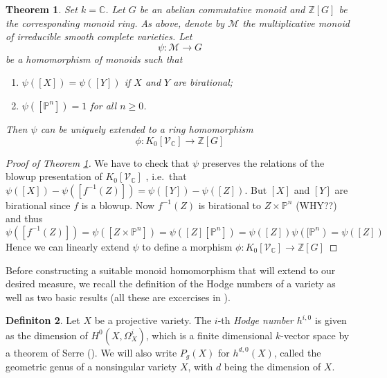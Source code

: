 \documentclass[11pt, a4paper, german]{article}
\theoremstyle{plain}
\newtheorem{theorem}{Theorem}
\theoremstyle{definition}
\newtheorem{definition}[theorem]{Definiton}
\newcommand{\gring}[1][k]{K_0[\mathcal{V}_#1]}
\begin{document}
\begin{theorem}
    \label{th1}
    Set $k = \mathbb{C}$. Let $G$ be an abelian commutative monoid and $\mathbb{Z}[G]$ be the corresponding monoid ring. As above, denote
    by $\mathcal{M}$ the multiplicative monoid of irreducible smooth complete varieties. Let
    \[
        \psi: \mathcal{M} \to G
    \]
    be a homomorphism of monoids such that
    \begin{enumerate}
        \item $\psi([X]) = \psi([Y])$ if $X$ and $Y$ are birational;
        \item $\psi([\mathbb{P}^n]) = 1$ for all $n \ge 0$.
    \end{enumerate}
    Then $\psi$ can be uniquely extended to a ring homomorphism 
    \[
        \phi: \gring[\mathbb{C}] \to \mathbb{Z} [G]
    \]
\end{theorem}

\begin{proof}[Proof of Theorem \ref{th1}]
    We have to check that $\psi$ preserves the relations of the blowup presentation of $\gring[\mathbb{C}]$
    , i.e.\ that $\psi([X]) - \psi([f^{-1}(Z)]) = \psi([Y]) - \psi([Z])$. 
    But $[X]$ and $[Y]$ are birational since $f$ is a blowup.
    Now $f^{-1}(Z)$ is birational to $Z \times \mathbb{P}^n$ (WHY??) and thus 
    \[
        \psi([f^{-1}(Z)]) = \psi([Z \times \mathbb{P}^n]) = \psi([Z][\mathbb{P}^n]) = \psi([Z])\psi([\mathbb{P}^n) = \psi([Z])
    \]
    Hence we can linearly extend $\psi$ to define a morphism $\phi \colon \gring[\mathbb{C}] \to \mathbb{Z} [G]$
\end{proof}

Before constructing a suitable monoid homomorphism that will extend to our desired measure, we recall the definition of the Hodge numbers
of a variety as well as two basic results (all these are excercises in \cite[Ch. II]{Ha}).

\begin{definition}
    Let $X$ be a projective variety. The $i$-th \emph{Hodge number} $h^{i,0}$ is given as the dimension of $H^0(X,\Omega^i_X)$, 
    which is a finite dimensional $k$-vector space by a theorem of Serre (\cite[§3 Prop. 7]{FAC}).
    We will also write $P_g(X)$ for $h^{d,0}(X)$, called the geometric genus of a nonsingular variety $X$, with $d$ being the dimension of $X$.
\end{definition}
\end{document}
